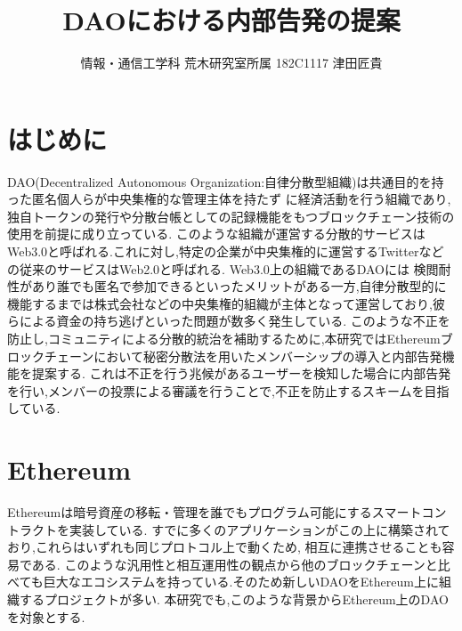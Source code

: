 \documentclass[twocolumn,10pt]{jarticle}
\title{\vspace{-1.5cm}\normalsize {\textbf {DAOにおける内部告発の提案}}}
\author{\vspace{-1.1cm} \normalsize	情報・通信工学科 荒木研究室所属 182C1117 津田匠貴}
\date{}
\begin{document}
\vspace{-10pt}
\maketitle

\vspace{-0.55cm}
\section{\normalsize はじめに}
\vspace{-0.2cm}
DAO(Decentralized Autonomous Organization:自律分散型組織)は共通目的を持った匿名個人らが中央集権的な管理主体を持たず
に経済活動を行う組織であり, 独自トークンの発行や分散台帳としての記録機能をもつブロックチェーン技術の使用を前提に成り立っている.
このような組織が運営する分散的サービスはWeb3.0と呼ばれる.これに対し,特定の企業が中央集権的に運営するTwitterなどの従来のサービスはWeb2.0と呼ばれる.
Web3.0上の組織であるDAOには 検閲耐性があり誰でも匿名で参加できるといったメリットがある一方,自律分散型的に機能するまでは株式会社などの中央集権的組織が主体となって運営しており,彼らによる資金の持ち逃げといった問題が数多く発生している.
このような不正を防止し,コミュニティによる分散的統治を補助するために,本研究ではEthereumブロックチェーンにおいて秘密分散法を用いたメンバーシップの導入と内部告発機能を提案する.
これは不正を行う兆候があるユーザーを検知した場合に内部告発を行い,メンバーの投票による審議を行うことで,不正を防止するスキームを目指している.
\vspace{-0.55cm}
\section{\normalsize Ethereum}
\vspace{-0.2cm}
Ethereumは暗号資産の移転・管理を誰でもプログラム可能にするスマートコントラクトを実装している.
すでに多くのアプリケーションがこの上に構築されており,これらはいずれも同じプロトコル上で動くため, 相互に連携させることも容易である.
このような汎用性と相互運用性の観点から他のブロックチェーンと比べても巨大なエコシステムを持っている.そのため新しいDAOをEthereum上に組織するプロジェクトが多い.
本研究でも,このような背景からEthereum上のDAOを対象とする.
\vspace{-0.55cm}
\end{document}
